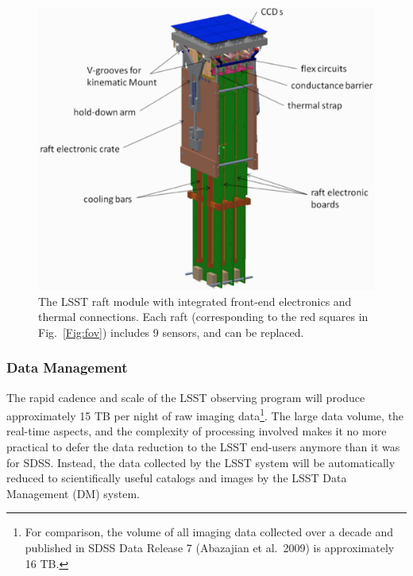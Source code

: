 \begin{figure}[ht]
\includegraphics[width=1.\hsize,clip]{raft-updated-cropped.pdf}
\caption{The LSST raft module with integrated front-end electronics
and thermal connections. Each raft (corresponding to the red squares
in Fig.~\ref{Fig:fov})
includes 9 sensors, and can be replaced.}
\label{Fig:raft}
\end{figure}



\vskip 0.2in
\subsubsection{ Data Management }
\label{sec:dm}

The rapid cadence and scale of the LSST observing program will produce
approximately 15 TB per night of raw imaging data\footnote{For
  comparison, the volume of all imaging data collected over a decade
  and published in SDSS Data Release 7 (Abazajian et al.~2009) is approximately 16 TB.}. The large data volume, the real-time aspects, and the complexity of processing involved makes it no more practical to defer the data reduction to the LSST end-users anymore than it was for SDSS. Instead, the data collected by the LSST system will be automatically reduced to scientifically useful catalogs and images by the LSST Data Management (DM) system.
\\

